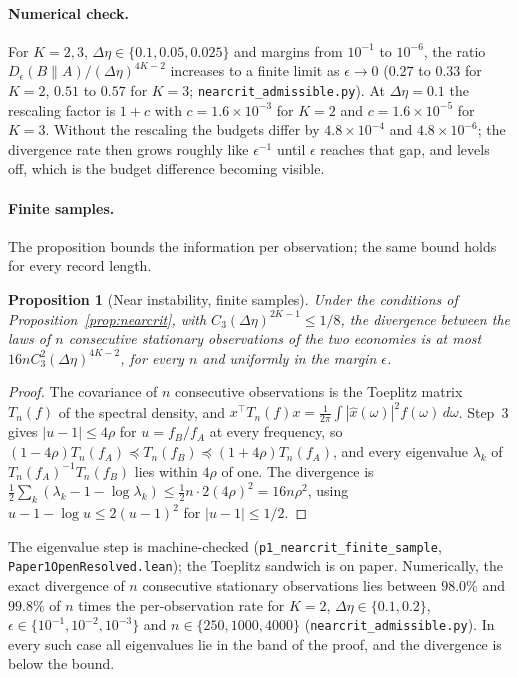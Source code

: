 \documentclass[12pt]{article}
\newtheorem{proposition}[theorem]{Proposition}
\theoremstyle{definition}
\theoremstyle{remark}
\begin{document}
\paragraph{Numerical check.} For $K=2,3$, $\Delta\eta\in\{0.1,0.05,0.025\}$ and margins from $10^{-1}$ to $10^{-6}$, the ratio $D_\epsilon(B\|A)/(\Delta\eta)^{4K-2}$ increases to a finite limit as $\epsilon\to0$ ($0.27$ to $0.33$ for $K=2$, $0.51$ to $0.57$ for $K=3$; \nolinkurl{nearcrit_admissible.py}). At $\Delta\eta=0.1$ the rescaling factor is $1+c$ with $c=1.6\times10^{-3}$ for $K=2$ and $c=1.6\times10^{-5}$ for $K=3$. Without the rescaling the budgets differ by $4.8\times10^{-4}$ and $4.8\times10^{-6}$; the divergence rate then grows roughly like $\epsilon^{-1}$ until $\epsilon$ reaches that gap, and levels off, which is the budget difference becoming visible.


\paragraph{Finite samples.} The proposition bounds the information per observation; the same bound holds for every record length.

\begin{proposition}[Near instability, finite samples]\label{prop:nearcritn}
Under the conditions of Proposition~\ref{prop:nearcrit}, with $C_3(\Delta\eta)^{2K-1}\le1/8$, the divergence between the laws of $n$ consecutive stationary observations of the two economies is at most $16nC_3^2(\Delta\eta)^{4K-2}$, for every $n$ and uniformly in the margin $\epsilon$.
\end{proposition}

\begin{proof}
The covariance of $n$ consecutive observations is the Toeplitz matrix $T_n(f)$ of the spectral density, and $x^\top T_n(f)x=\frac1{2\pi}\int|\hat x(\omega)|^2f(\omega)\,d\omega$. Step~3 gives $|u-1|\le4\rho$ for $u=f_B/f_A$ at every frequency, so $(1-4\rho)T_n(f_A)\preceq T_n(f_B)\preceq(1+4\rho)T_n(f_A)$, and every eigenvalue $\lambda_k$ of $T_n(f_A)^{-1}T_n(f_B)$ lies within $4\rho$ of one. The divergence is $\frac12\sum_k(\lambda_k-1-\log\lambda_k)\le\frac12n\cdot2(4\rho)^2=16n\rho^2$, using $u-1-\log u\le2(u-1)^2$ for $|u-1|\le1/2$.
\end{proof}

The eigenvalue step is machine-checked (\texttt{p1\_nearcrit\_finite\_sample}, \nolinkurl{Paper1OpenResolved.lean}); the Toeplitz sandwich is on paper. Numerically, the exact divergence of $n$ consecutive stationary observations lies between $98.0\%$ and $99.8\%$ of $n$ times the per-observation rate for $K=2$, $\Delta\eta\in\{0.1,0.2\}$, $\epsilon\in\{10^{-1},10^{-2},10^{-3}\}$ and $n\in\{250,1000,4000\}$ (\nolinkurl{nearcrit_admissible.py}). In every such case all eigenvalues lie in the band of the proof, and the divergence is below the bound.
\end{document}
